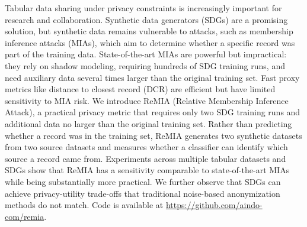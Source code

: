 Tabular data sharing under privacy constraints is increasingly important for research and collaboration. Synthetic data generators (SDGs) are a promising solution, but synthetic data remains vulnerable to attacks, such as membership inference attacks (MIAs), which aim to determine whether a specific record was part of the training data.
State-of-the-art MIAs are powerful but impractical: they rely on shadow modeling, requiring hundreds of SDG training runs, and need auxiliary data several times larger than the original training set.
Fast proxy metrics like distance to closest record (DCR) are efficient but have limited sensitivity to MIA risk.
We introduce ReMIA (Relative Membership Inference Attack), a practical privacy metric that requires only two SDG training runs and additional data no larger than the original training set.
Rather than predicting whether a record was in the training set, ReMIA generates two synthetic datasets from two source datasets and measures whether a classifier can identify which source a record came from. Experiments across multiple tabular datasets and SDGs show that ReMIA has a sensitivity comparable to state-of-the-art MIAs while being substantially more practical.
We further observe that SDGs can achieve privacy-utility trade-offs that traditional noise-based anonymization methods do not match.
Code is available at \url{https://github.com/aindo-com/remia}.
